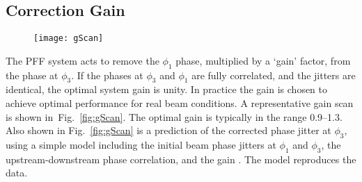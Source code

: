 \subsection{\label{ss:gain}Correction Gain}

\begin{figure}
 \centering
  \texttt{[image: gScan]}%
  \caption{\label{f:gScan}
  }
\end{figure}

The PFF system acts to remove the \(\phi_1\) phase, multiplied by a `gain' 
factor, from the phase at \(\phi_3\). If the phases at \(\phi_3\) and 
\(\phi_1\) are fully correlated, and the jitters are identical, the optimal 
system gain is unity.
In practice the gain is chosen to achieve optimal 
performance for real beam conditions. A representative gain scan is shown 
in~Fig.~\ref{fig:gScan}. The optimal gain is typically in the range 
0.9--1.3. Also shown in Fig.~\ref{fig:gScan} is a prediction of 
the corrected phase jitter at \(\phi_3\), using a simple model including the 
initial beam phase jitters at \(\phi_1\) and 
\(\phi_3\), the upstream-downstream phase correlation, and the gain 
\cite{RobertsThesis}. The model reproduces the data.

